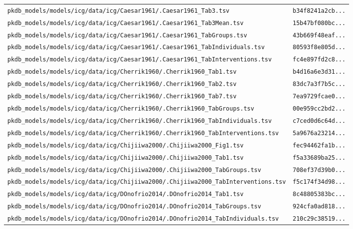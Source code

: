 \begin{longtable}{ll}
\texttt{pkdb\_models/models/icg/data/icg/Caesar1961/.Caesar1961\_Tab3.tsv} & \texttt{b34f8241a2cb...} \\
\texttt{pkdb\_models/models/icg/data/icg/Caesar1961/.Caesar1961\_Tab3Mean.tsv} & \texttt{15b47bf080bc...} \\
\texttt{pkdb\_models/models/icg/data/icg/Caesar1961/.Caesar1961\_TabGroups.tsv} & \texttt{43b669f48eaf...} \\
\texttt{pkdb\_models/models/icg/data/icg/Caesar1961/.Caesar1961\_TabIndividuals.tsv} & \texttt{80593f8e805d...} \\
\texttt{pkdb\_models/models/icg/data/icg/Caesar1961/.Caesar1961\_TabInterventions.tsv} & \texttt{fc4e897fd2c8...} \\
\texttt{pkdb\_models/models/icg/data/icg/Cherrik1960/.Cherrik1960\_Tab1.tsv} & \texttt{b4d16a6e3d31...} \\
\texttt{pkdb\_models/models/icg/data/icg/Cherrik1960/.Cherrik1960\_Tab2.tsv} & \texttt{83dc7a3f7b5c...} \\
\texttt{pkdb\_models/models/icg/data/icg/Cherrik1960/.Cherrik1960\_Tab7.tsv} & \texttt{7ea9729fcae0...} \\
\texttt{pkdb\_models/models/icg/data/icg/Cherrik1960/.Cherrik1960\_TabGroups.tsv} & \texttt{00e959cc2bd2...} \\
\texttt{pkdb\_models/models/icg/data/icg/Cherrik1960/.Cherrik1960\_TabIndividuals.tsv} & \texttt{c7ced0d6c64d...} \\
\texttt{pkdb\_models/models/icg/data/icg/Cherrik1960/.Cherrik1960\_TabInterventions.tsv} & \texttt{5a9676a23214...} \\
\texttt{pkdb\_models/models/icg/data/icg/Chijiiwa2000/.Chijiiwa2000\_Fig1.tsv} & \texttt{fec94462fa1b...} \\
\texttt{pkdb\_models/models/icg/data/icg/Chijiiwa2000/.Chijiiwa2000\_Tab1.tsv} & \texttt{f5a33689ba25...} \\
\texttt{pkdb\_models/models/icg/data/icg/Chijiiwa2000/.Chijiiwa2000\_TabGroups.tsv} & \texttt{708ef37d39b0...} \\
\texttt{pkdb\_models/models/icg/data/icg/Chijiiwa2000/.Chijiiwa2000\_TabInterventions.tsv} & \texttt{f5c174f34d98...} \\
\texttt{pkdb\_models/models/icg/data/icg/DOnofrio2014/.DOnofrio2014\_Tab1.tsv} & \texttt{8c48805383bc...} \\
\texttt{pkdb\_models/models/icg/data/icg/DOnofrio2014/.DOnofrio2014\_TabGroups.tsv} & \texttt{924cfa0ad818...} \\
\texttt{pkdb\_models/models/icg/data/icg/DOnofrio2014/.DOnofrio2014\_TabIndividuals.tsv} & \texttt{210c29c38519...} \\

\end{longtable}
